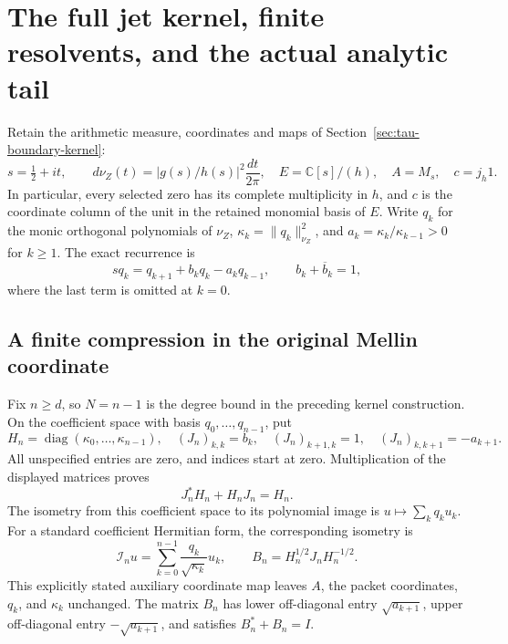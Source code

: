 \section{The full jet kernel, finite resolvents, and the actual analytic tail}
\label{sec:kernel-resolvent}

Retain the arithmetic measure, coordinates and maps of
Section~\ref{sec:tau-boundary-kernel}:
\[
 s=\tfrac12+it,\qquad d\nu_Z(t)=|g(s)/h(s)|^2\frac{dt}{2\pi},
 \quad E=\mathbb C[s]/(h),\quad A=M_s,\quad c=j_h1.
\]
In particular, every selected zero has its complete multiplicity in
\(h\), and \(c\) is the coordinate column of the unit in the retained
monomial basis of \(E\).  Write \(q_k\) for the monic orthogonal
polynomials of \(\nu_Z\), \(\kappa_k=\|q_k\|_{\nu_Z}^2\), and
\(a_k=\kappa_k/\kappa_{k-1}>0\) for \(k\geq1\).  The exact recurrence
is
\[
 sq_k=q_{k+1}+b_kq_k-a_kq_{k-1},\qquad
 b_k+\overline b_k=1,                                    \tag{KR.1}
\]
where the last term is omitted at \(k=0\).

\subsection{A finite compression in the original Mellin coordinate}

Fix \(n\geq d\), so \(N=n-1\) is the degree bound in the preceding
kernel construction.  On the coefficient space with basis
\(q_0,\ldots,q_{n-1}\), put
\[
 H_n=\operatorname{diag}(\kappa_0,\ldots,\kappa_{n-1}),
 \quad (J_n)_{k,k}=b_k,\quad
 (J_n)_{k+1,k}=1,\quad (J_n)_{k,k+1}=-a_{k+1}.             \tag{KR.2}
\]
All unspecified entries are zero, and indices start at zero.
Multiplication of the displayed matrices proves
\[
 J_n^*H_n+H_nJ_n=H_n.                                    \tag{KR.3}
\]
The isometry from this coefficient space to its polynomial image is
\(u\mapsto\sum_kq_ku_k\).  For a standard coefficient Hermitian form,
the corresponding isometry is
\[
 \mathcal I_n u=\sum_{k=0}^{n-1}\frac{q_k}{\sqrt{\kappa_k}}u_k,
 \qquad B_n=H_n^{1/2}J_nH_n^{-1/2}.                       \tag{KR.4}
\]
This explicitly stated auxiliary coordinate map leaves \(A\), the
packet coordinates, \(q_k\), and \(\kappa_k\) unchanged.
The matrix \(B_n\) has lower off-diagonal entry \(\sqrt{a_{k+1}}\),
upper off-diagonal entry \(-\sqrt{a_{k+1}}\), and satisfies
\(B_n^*+B_n=I\).

